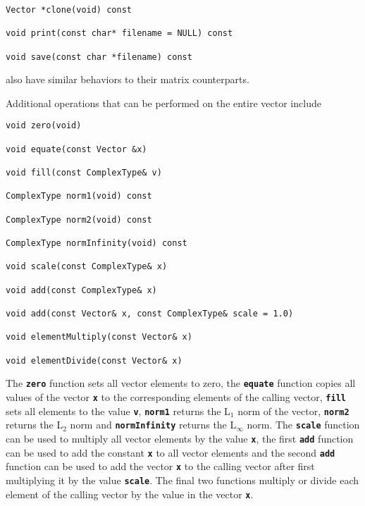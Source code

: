 {
\color{red}
\begin{Verbatim}[fontseries=b]
Vector *clone(void) const

void print(const char* filename = NULL) const

void save(const char *filename) const
\end{Verbatim}
}

also have similar behaviors to their matrix counterparts.

Additional operations that can be performed on the entire vector include

{
\color{red}
\begin{Verbatim}[fontseries=b]
void zero(void)

void equate(const Vector &x)

void fill(const ComplexType& v)

ComplexType norm1(void) const

ComplexType norm2(void) const

ComplexType normInfinity(void) const

void scale(const ComplexType& x)

void add(const ComplexType& x)

void add(const Vector& x, const ComplexType& scale = 1.0)

void elementMultiply(const Vector& x)

void elementDivide(const Vector& x)
\end{Verbatim}
}

The \texttt{\textbf{zero}} function sets all vector elements to zero, the \texttt{\textbf{equate}} function copies all values of the vector \texttt{\textbf{x}} to the corresponding elements of the calling vector, \texttt{\textbf{fill}} sets all elements to the value \texttt{\textbf{v}}, \texttt{\textbf{norm1}} returns the L${}_{1}$ norm of the vector, \texttt{\textbf{norm2}} returns the L${}_{2}$ norm and \texttt{\textbf{normInfinity}} returns the L${}_{\mathrm{\infty }}$ norm. The \texttt{\textbf{scale}} function can be used to multiply all vector elements by the value \texttt{\textbf{x}}, the first \texttt{\textbf{add}} function can be used to add the constant \texttt{\textbf{x}} to all vector elements and the second \texttt{\textbf{add}} function can be used to add the vector \texttt{\textbf{x}} to the calling vector after first multiplying it by the value \texttt{\textbf{scale}}. The final two functions multiply or divide each element of the calling vector by the value in the vector \texttt{\textbf{x}}.

